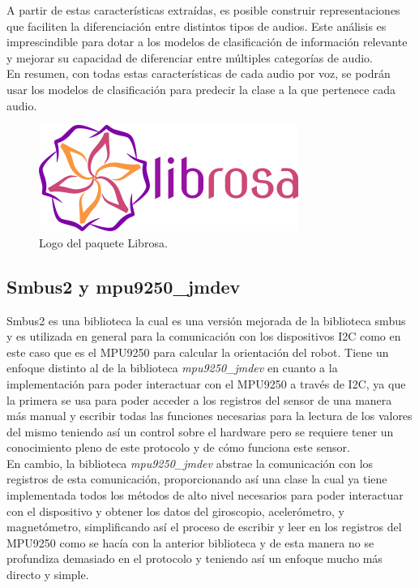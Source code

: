 A partir de estas características extraídas, es posible construir representaciones que faciliten la diferenciación entre distintos tipos de audios. Este análisis es imprescindible para dotar a los modelos de clasificación de información relevante y mejorar su capacidad de diferenciar entre múltiples categorías de audio.\\

En resumen, con todas estas características de cada audio por voz, se podrán usar los modelos de clasificación para predecir la clase a la que pertenece cada audio. 

\begin{figure}[H]
  \centering
  \includegraphics[scale=0.4]{figs/librosa} %
  \caption{Logo del paquete Librosa.}
  \label{fig:librosa}
\end{figure}


\subsection{Smbus2 y mpu9250\_jmdev}
\label{subsec:smbus2mpu9250jmdev}


Smbus2 es una biblioteca la cual es una versión mejorada de la biblioteca smbus y es utilizada en general para la comunicación con los dispositivos I2C como en este caso que es el MPU9250 para calcular la orientación del robot. Tiene un enfoque distinto al de la biblioteca \textit{mpu9250\_jmdev} en cuanto a la implementación para poder interactuar con el MPU9250 a través de I2C, ya que la primera se usa para poder acceder a los registros del sensor de una manera más manual y escribir todas las funciones necesarias para la lectura de los valores del mismo teniendo así un control sobre el hardware pero se requiere tener un conocimiento pleno de este protocolo y de cómo funciona este sensor.\\

En cambio, la biblioteca \textit{mpu9250\_jmdev} abstrae la comunicación con los registros de esta comunicación, proporcionando así una clase la cual ya tiene implementada todos los métodos de alto nivel necesarios para poder interactuar con el dispositivo y obtener los datos del giroscopio, acelerómetro, y magnetómetro, simplificando así el proceso de escribir y leer en los registros del MPU9250 como se hacía con la anterior biblioteca y de esta manera no se profundiza demasiado en el protocolo y teniendo así un enfoque mucho más directo y simple.


